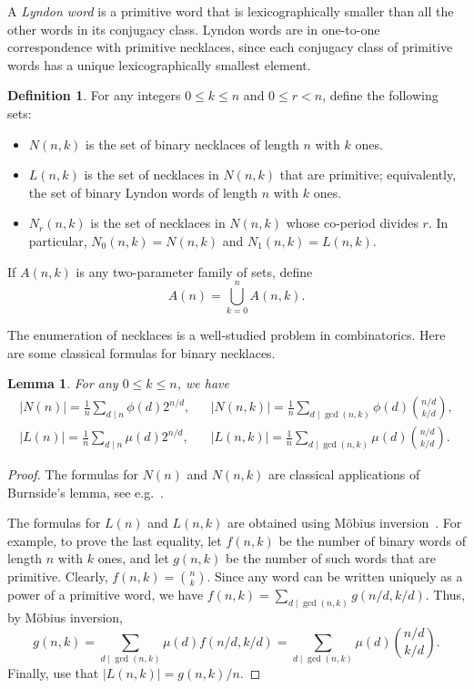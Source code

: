 \documentclass[12pt]{article}
\newcommand{\card}[1]{\left|#1\right|}
\newtheorem{lemma}[theorem]{Lemma}
\theoremstyle{definition}
\newtheorem{definition}{Definition}
\begin{document}
A {\em Lyndon word} is a primitive word that is lexicographically smaller than all the other words in its conjugacy class. Lyndon words are in one-to-one correspondence with primitive necklaces, since each conjugacy class of primitive words has a unique lexicographically smallest element.


\begin{definition}
    For any integers $0\le k\le n$ and $0\le r< n$, define the following sets:
    \begin{itemize}     
        \item $N(n, k)$ is the set of binary necklaces of length $n$ with $k$ ones. 
        \item $L(n,k)$ is the set of necklaces in $N(n,k)$ that are primitive; equivalently, the set of binary Lyndon words of length $n$ with $k$ ones.
        \item $N_r(n, k)$ is the set of necklaces in $N(n,k)$ whose co-period divides $r$. In particular, $N_0(n, k)=N(n, k)$ and
        $N_1(n, k)=L(n, k)$.
    \end{itemize}
\end{definition}

If $A(n,k)$ is any two-parameter family of sets, define 
\begin{equation}\label{eq:A}
A(n)=\bigcup_{k=0}^n A(n,k).
\end{equation}

The enumeration of necklaces is a well-studied problem in combinatorics. Here are some classical formulas for binary necklaces.

\begin{lemma}\label{lem:NL} 
For any $0\le k\le n$, we have
\begin{align*}\card{N(n)}=\frac{1}{n}\sum_{d\mid n}\phi(d) 2^{n/d}, &&
\card{N(n,k)}=\frac{1}{n}\sum_{d\mid \gcd(n,k)}\phi(d) \binom{n/d}{k/d},\\
\card{L(n)}=\frac{1}{n}\sum_{d\mid n}\mu(d) 2^{n/d}, &&
\card{L(n,k)}=\frac{1}{n}\sum_{d\mid \gcd(n,k)}\mu(d) \binom{n/d}{k/d}.
\end{align*}
\end{lemma}

\begin{proof}
    The formulas for $N(n)$ and $N(n,k)$ are classical applications of Burnside's lemma, see e.g.~\cite{StanleyAC}.
    
    The formulas for $L(n)$ and $L(n,k)$ are obtained using M\"obius inversion~\cite{Lothaire}. For example, to prove the last equality, let $f(n,k)$ be the number of binary words of length $n$ with $k$ ones, and let $g(n,k)$ be the number of such words that are primitive. Clearly, $f(n,k)=\binom{n}{k}$. Since any word can be written uniquely as a power of a primitive word, we have $f(n,k)=\sum_{d\mid\gcd(n,k)}g(n/d,k/d)$. Thus, by M\"obius inversion,
    $$g(n,k)=\sum_{d\mid\gcd(n,k)}\mu(d)f(n/d,k/d)=\sum_{d\mid\gcd(n,k)}\mu(d)\binom{n/d}{k/d}.$$
    Finally, use that $\card{L(n,k)}=g(n,k)/n$.
\end{proof}
\end{document}
